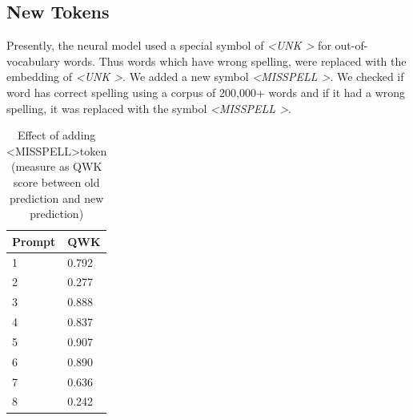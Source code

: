 \documentclass[11pt,a4paper]{article}
\newcommand{\acomment}[1]{{\bf{\color{blue}{{[Aman: #1]}}}}}
\begin{document}

\subsection{New Tokens}

Presently, the neural model used a special symbol of \textit{\textless UNK \textgreater} for out-of-vocabulary words. Thus words which have wrong spelling, were replaced with the embedding of \textit{\textless UNK \textgreater}. We added a new symbol \textit{\textless MISSPELL \textgreater}. We checked if word has correct spelling using a corpus of 200,000+ words and if it had a wrong spelling, it was replaced with the symbol \textit{\textless MISSPELL \textgreater}.\\

\begin{table}[]
  \centering
  \begin{tabular}{|l|l|}
  \hline
  \textbf{Prompt} & \textbf{QWK} \\ \hline
  1 & 0.792 \\ \hline
  2 & 0.277 \\ \hline
  3 & 0.888 \\ \hline
  4 & 0.837 \\ \hline
  5 & 0.907 \\ \hline
  6 & 0.890 \\ \hline
  7 & 0.636 \\ \hline
  8 & 0.242 \\ \hline
  \end{tabular}
  \caption{Effect of adding \textless MISSPELL\textgreater token (measure as QWK score between old prediction and new prediction)}
  \label{misp_diff}
\end{table}
\end{document}
